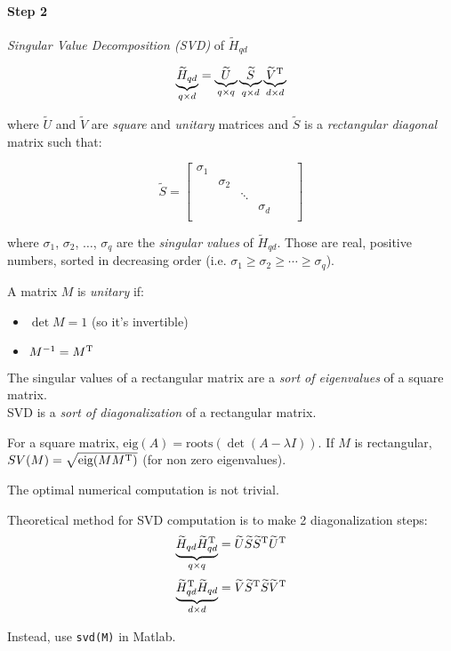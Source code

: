 \paragraph{Step 2} \emph{Singular Value Decomposition (SVD)} of $\tilde{H}_{qd}$

\[
    \underbrace{\widetilde{H}_{qd}}_{q\times d} = \underbrace{\widetilde{U}}_{q\times q} \underbrace{\widetilde{S}}_{q\times d} \underbrace{\widetilde{V}^{\mathrm{T}}}_{d\times d}
\]

where $\tilde{U}$ and $\tilde{V}$ are \emph{square} and \emph{unitary} matrices and $\tilde{S}$ is a \emph{rectangular diagonal} matrix such that:

\[
    \tilde{S} = \begin{bmatrix}
        \sigma_1 & & & & &\\
        & \sigma_2 & & & &\\
        & & \ddots & & &\\
        & & & \sigma_d & &\\
    \end{bmatrix}
\]

where $\sigma_1$, $\sigma_2$, $\ldots$, $\sigma_q$ are the \emph{singular values} of $\tilde{H}_{qd}$.
Those are real, positive numbers, sorted in decreasing order (i.e. $\sigma_1 \ge \sigma_2 \ge \cdots \ge \sigma_q$).

\begin{definition}
    A matrix $M$ is \emph{unitary} if:
    \begin{itemize}
        \item $\det M = 1$ (so it's invertible)
        \item $M^{-1} = M^{\mathrm{T}}$
    \end{itemize}
\end{definition}

\begin{obs}
    The singular values of a rectangular matrix are a \emph{sort of eigenvalues} of a square matrix.\\
    SVD is a \emph{sort of diagonalization} of a rectangular matrix.
\end{obs}

\begin{recall}
    For a square matrix, $\text{eig}(A) = \text{roots}(\det(A-\lambda I))$. If $M$ is rectangular, $SV(M) = \sqrt{\text{eig}(MM^{\mathrm{T}})}$ (for non zero eigenvalues).
\end{recall}

\begin{remark}
    The optimal numerical computation is not trivial. 

    Theoretical method for SVD computation is to make 2 diagonalization steps:
    \[
        \underbrace{\widetilde{H}_{qd} \widetilde{H}_{qd}^{\mathrm{T}}}_{q\times q} = \widetilde{U}\widetilde{S}\widetilde{S}^{\mathrm{T}}\widetilde{U}^{\mathrm{T}}
    \]
    \[
        \underbrace{\widetilde{H}_{qd}^{\mathrm{T}} \widetilde{H}_{qd}}_{d\times d} = \widetilde{V}\widetilde{S}^{\mathrm{T}}\widetilde{S}\widetilde{V}^{\mathrm{T}}
    \]
    
    Instead, use \texttt{svd(M)} in Matlab.
\end{remark}

